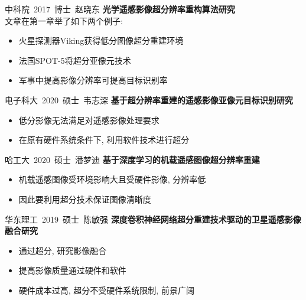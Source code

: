 \begin{frame}{中科院\ 2017\ 博士\ 赵晓东}
    \textbf{光学遥感影像超分辨率重构算法研究}\\[1cm]
    文章在第一章举了如下两个例子:
    \begin{itemize}
        \item 火星探测器Viking获得低分图像超分重建环境
        \item 法国SPOT-5将超分亚像元技术
        \item 军事中提高影像分辨率可提高目标识别率
    \end{itemize}
\end{frame}

\begin{frame}{电子科大\ 2020\ 硕士\ 韦志深}
    \textbf{基于超分辨率重建的遥感影像亚像元目标识别研究}\\[1cm]

    \begin{itemize}
        \item 低分影像无法满足对遥感影像处理要求
        \item 在原有硬件系统条件下, 利用软件技术进行超分
    \end{itemize}
\end{frame}

\begin{frame}{哈工大\ 2020\ 硕士\ 潘梦迪}
    \textbf{基于深度学习的机载遥感图像超分辨率重建}\\[1cm]

    \begin{itemize}
        \item 机载遥感图像受环境影响大且受硬件影像, 分辨率低
        \item 因此要利用超分技术保证图像清晰度
    \end{itemize}
\end{frame}

\begin{frame}{华东理工\ 2019\ 硕士\ 陈敏强}
    \textbf{深度卷积神经网络超分重建技术驱动的卫星遥感影像融合研究}\\[1cm]

    \begin{itemize}
        \item 通过超分, 研究影像融合
        \item 提高影像质量通过硬件和软件
        \item 硬件成本过高, 超分不受硬件系统限制, 前景广阔
    \end{itemize}
\end{frame}

